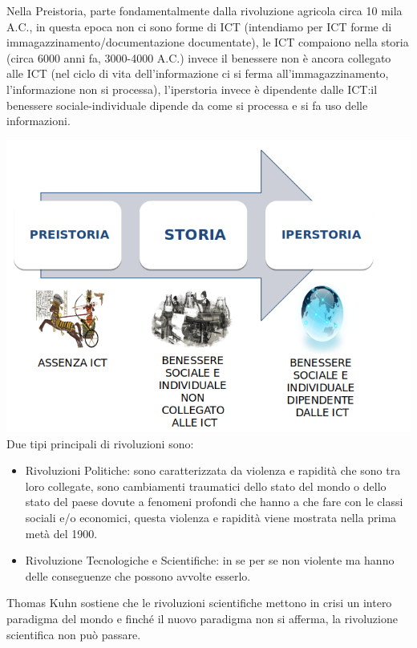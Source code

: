 \documentclass[]{article}
\begin{document}
Nella Preistoria, parte fondamentalmente dalla rivoluzione agricola
circa 10 mila A.C., in questa epoca non ci sono forme di ICT (intendiamo
per ICT forme di immagazzinamento/documentazione documentate), le ICT
compaiono nella storia (circa 6000 anni fa, 3000-4000 A.C.) invece il
benessere non è ancora collegato alle ICT (nel ciclo di vita
dell'informazione ci si ferma all'immagazzinamento, l'informazione non
si processa), l'iperstoria invece è dipendente dalle ICT:il 
benessere sociale-individuale dipende da come si
processa e si fa uso delle informazioni.

\includegraphics[scale=0.6]{image1.png}
\newline
Due tipi principali di rivoluzioni sono:

\begin{itemize}
	 
	\item
	Rivoluzioni Politiche: sono caratterizzata da violenza e rapidità che
	sono tra loro collegate, sono cambiamenti traumatici dello stato del
	mondo o dello stato del paese dovute a fenomeni profondi che hanno a
	che fare con le classi sociali e/o economici, questa violenza e
	rapidità viene mostrata nella prima metà del 1900.
	\item
	Rivoluzione Tecnologiche e Scientifiche: in se per se non violente ma
	hanno delle conseguenze che possono avvolte esserlo.
\end{itemize}

Thomas Kuhn sostiene che le rivoluzioni scientifiche mettono in crisi un
intero paradigma del mondo e finché il nuovo paradigma non si afferma,
la rivoluzione scientifica non può passare.
\end{document}
